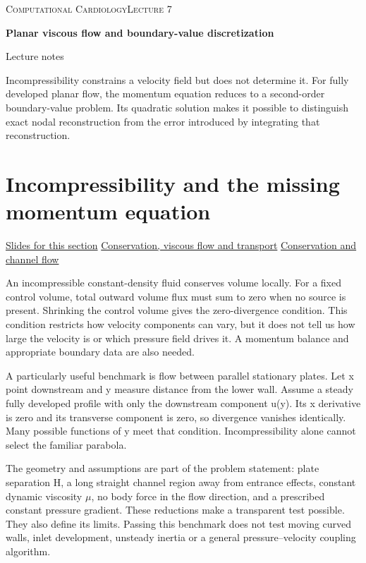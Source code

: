 \documentclass[11pt,letterpaper]{article}
\theoremstyle{definition}\newtheorem{definition}{Definition}\newtheorem{example}{Example}
\numberwithin{equation}{section}
\begin{document}
{\small\scshape Computational Cardiology\hfill Lecture 7}\par\medskip
{\raggedright{}\LARGE\bfseries\color{ink} Planar viscous flow and boundary-value discretization\par}\medskip
{\small Lecture notes}\par\bigskip
Incompressibility constrains a velocity field but does not determine it. For fully developed planar flow, the momentum equation reduces to a second-order boundary-value problem. Its quadratic solution makes it possible to distinguish exact nodal reconstruction from the error introduced by integrating that reconstruction.

\section{Incompressibility and the missing momentum equation}
\hypertarget{note-incompressibility-and-the-missing-momentum-equation}{}\label{note:incompressibility-and-the-missing-momentum-equation}
{\small \href{slides.html\#frame=the-incompressible-balance\&step=1}{Slides for this section} \quad \href{../modules/cfd/index.html}{Conservation, viscous flow and transport} \quad \href{../modules/animations/conservation-flow.html}{Conservation and channel flow}}\par
An incompressible constant-density fluid conserves volume locally. For a fixed control volume, total outward volume flux must sum to zero when no source is present. Shrinking the control volume gives the zero-divergence condition. This condition restricts how velocity components can vary, but it does not tell us how large the velocity is or which pressure field drives it. A momentum balance and appropriate boundary data are also needed.

A particularly useful benchmark is flow between parallel stationary plates. Let x point downstream and y measure distance from the lower wall. Assume a steady fully developed profile with only the downstream component u(y). Its x derivative is zero and its transverse component is zero, so divergence vanishes identically. Many possible functions of y meet that condition. Incompressibility alone cannot select the familiar parabola.

The geometry and assumptions are part of the problem statement: plate separation H, a long straight channel region away from entrance effects, constant dynamic viscosity \ensuremath{\mu}, no body force in the flow direction, and a prescribed constant pressure gradient. These reductions make a transparent test possible. They also define its limits. Passing this benchmark does not test moving curved walls, inlet development, unsteady inertia or a general pressure--velocity coupling algorithm.
\end{document}
